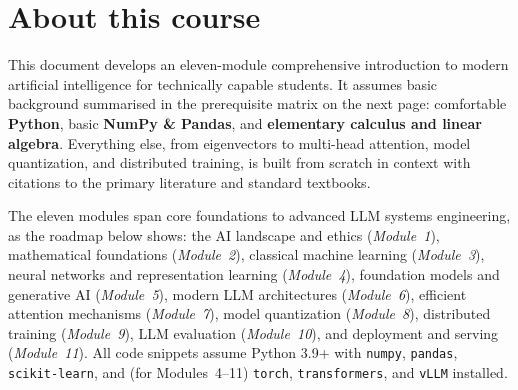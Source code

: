 \documentclass[11pt,a4paper]{article}
\begin{document}
	\clearpage
	\tableofcontents
	\clearpage
	
	\section*{About this course}
	
	This document develops an eleven-module comprehensive introduction to modern artificial
	intelligence for technically capable students. It assumes basic background
	summarised in the prerequisite matrix on the next page: comfortable
	\textbf{Python}, basic \textbf{NumPy \& Pandas}, and \textbf{elementary
		calculus and linear algebra}. Everything else, from eigenvectors to multi-head attention, model quantization, and distributed training, is built
	from scratch in context with citations to the primary literature and
	standard textbooks.
	
	The eleven modules span core foundations to advanced LLM systems engineering, as the roadmap below shows:
	the AI landscape and ethics (\emph{Module~1}), mathematical
	foundations (\emph{Module~2}), classical machine learning (\emph{Module~3}), neural networks and representation learning (\emph{Module~4}), foundation models and generative AI (\emph{Module~5}), modern LLM architectures (\emph{Module~6}), efficient attention mechanisms (\emph{Module~7}), model quantization (\emph{Module~8}), distributed training (\emph{Module~9}), LLM evaluation (\emph{Module~10}), and deployment and serving (\emph{Module~11}). All code snippets
	assume Python 3.9+ with \texttt{numpy}, \texttt{pandas},
	\texttt{scikit-learn}, and (for Modules~4--11) \texttt{torch}, \texttt{transformers}, and \texttt{vLLM} installed.
	
\end{document}
